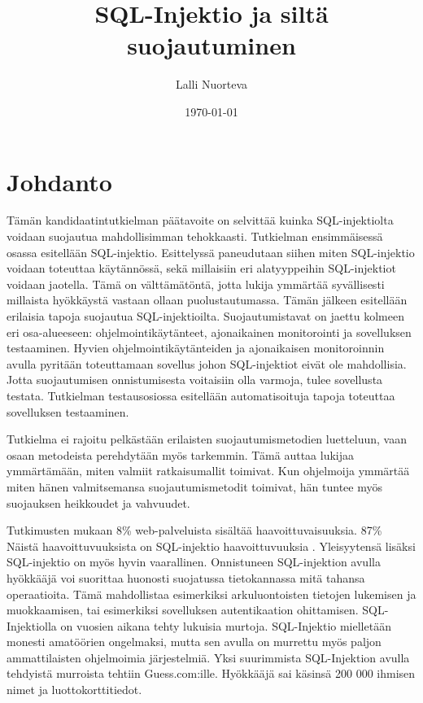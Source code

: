 \documentclass[finnish]{tktltiki2}
\title{SQL-Injektio ja siltä suojautuminen}
\author{Lalli Nuorteva}
\date{\today}
\theoremstyle{definition}
\theoremstyle{remark}
\begin{document}
	
	\frontmatter      %
	
	\maketitle        %
	
	\tableofcontents  %
	
	
	\mainmatter       %
	
	\section{Johdanto}
	Tämän kandidaatintutkielman päätavoite on selvittää kuinka SQL-injektiolta voidaan suojautua mahdollisimman tehokkaasti. Tutkielman ensimmäisessä osassa esitellään SQL-injektio. Esittelyssä paneudutaan siihen miten SQL-injektio voidaan toteuttaa käytännössä, sekä millaisiin eri alatyyppeihin SQL-injektiot voidaan jaotella. Tämä on välttämätöntä, jotta lukija ymmärtää syvällisesti millaista hyökkäystä vastaan ollaan puolustautumassa. Tämän jälkeen esitellään erilaisia tapoja suojautua SQL-injektioilta. Suojautumistavat on jaettu kolmeen eri osa-alueeseen: ohjelmointikäytänteet, ajonaikainen monitorointi ja sovelluksen testaaminen. Hyvien ohjelmointikäytänteiden ja ajonaikaisen monitoroinnin avulla pyritään toteuttamaan sovellus johon SQL-injektiot eivät ole mahdollisia. Jotta suojautumisen onnistumisesta voitaisiin olla varmoja, tulee sovellusta testata. Tutkielman testausosiossa esitellään automatisoituja tapoja toteuttaa sovelluksen testaaminen.
	
	Tutkielma ei rajoitu pelkästään erilaisten suojautumismetodien luetteluun, vaan osaan metodeista perehdytään myös tarkemmin. Tämä auttaa lukijaa ymmärtämään, miten valmiit ratkaisumallit toimivat. Kun ohjelmoija ymmärtää miten hänen valmitsemansa suojautumismetodit toimivat, hän tuntee myös suojauksen heikkoudet ja vahvuudet.
	
	Tutkimusten mukaan 8\% web-palveluista sisältää haavoittuvaisuuksia.  87\% Näistä haavoittuvuuksista on SQL-injektio haavoittuvuuksia \cite{detection}. Yleisyytensä lisäksi SQL-injektio on myös hyvin vaarallinen. Onnistuneen SQL-injektion avulla hyökkääjä voi suorittaa huonosti suojatussa tietokannassa mitä tahansa operaatioita. Tämä mahdollistaa esimerkiksi arkuluontoisten tietojen lukemisen ja muokkaamisen, tai esimerkiksi sovelluksen autentikaation ohittamisen. SQL-Injektiolla on vuosien aikana tehty lukuisia murtoja. SQL-Injektio mielletään monesti amatöörien ongelmaksi, mutta  sen avulla on murrettu myös paljon ammattilaisten ohjelmoimia järjestelmiä. Yksi suurimmista SQL-Injektion avulla tehdyistä murroista tehtiin Guess.com:ille. Hyökkääjä sai käsinsä 200 000 ihmisen nimet ja luottokorttitiedot.
	
\end{document}
